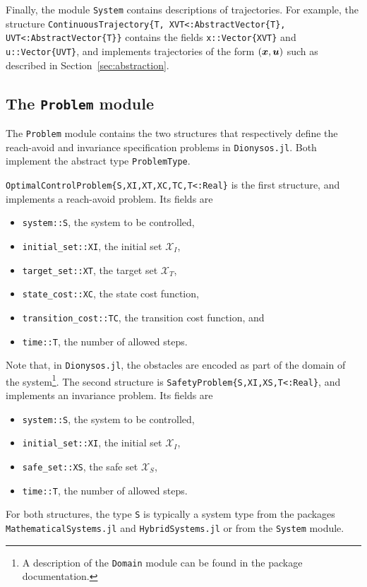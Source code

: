 \documentclass{juliacon}
\begin{document}
\vskip 6pt

Finally, the module \texttt{System} contains descriptions of trajectories. For example, the structure \texttt{ContinuousTrajectory\{T, XVT<:AbstractVector\{T\}, UVT<:AbstractVector\{T\}\}} contains the fields \texttt{x::Vector\{XVT\}} and \texttt{u::Vector\{UVT\}}, and implements trajectories of the form $(\boldsymbol{x}, \boldsymbol{u})$ such as described in Section~\ref{sec:abstraction}.

\subsection{The \texttt{Problem} module}

The \texttt{Problem} module contains the two structures that respectively define the reach-avoid and invariance specification problems in \texttt{Dionysos.jl}. Both implement the abstract type \texttt{ProblemType}.

\vskip 6pt

\texttt{OptimalControlProblem\{S,XI,XT,XC,TC,T<:Real\}} is the first structure, and implements a reach-avoid problem. Its fields are
\begin{itemize}
    \item \texttt{system::S}, the system to be controlled, 
    \item \texttt{initial\_set::XI}, the initial set $\mathcal{X}_I$, 
    \item \texttt{target\_set::XT}, the target set $\mathcal{X}_T$, 
    \item \texttt{state\_cost::XC}, the state cost function, 
    \item \texttt{transition\_cost::TC}, the transition cost function, and
    \item \texttt{time::T}, the number of allowed steps.
\end{itemize}
Note that, in \texttt{Dionysos.jl}, the obstacles are encoded as part of the domain of the system\footnote{A description of the \texttt{Domain} module can be found in the package documentation.}. The second structure is \texttt{SafetyProblem\{S,XI,XS,T<:Real\}}, and implements an invariance problem. Its fields are 
\begin{itemize}
    \item \texttt{system::S}, the system to be controlled,
    \item \texttt{initial\_set::XI}, the initial set $\mathcal{X}_I$,
    \item \texttt{safe\_set::XS}, the safe set $\mathcal{X}_S$, 
    \item \texttt{time::T}, the number of allowed steps.
\end{itemize}
For both structures, the type \texttt{S} is typically a system type from the packages \texttt{MathematicalSystems.jl} and \texttt{HybridSystems.jl} or from the \texttt{System} module. 
\end{document}
